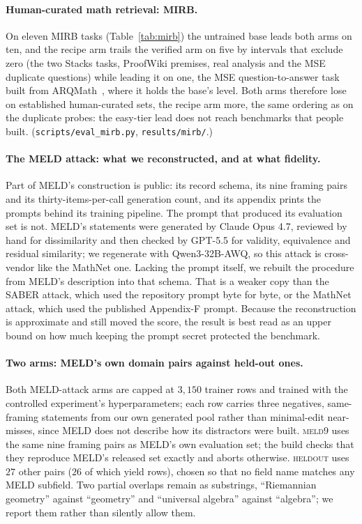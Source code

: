 \paragraph{Human-curated math retrieval: MIRB.}On eleven MIRB tasks (Table~\ref{tab:mirb}) the untrained base leads both arms on ten, and the recipe arm trails the verified arm on five by intervals that exclude zero (the two Stacks tasks, ProofWiki premises, real analysis and the MSE duplicate questions) while leading it on one, the MSE question-to-answer task built from ARQMath~\citep{zanibbi2020arqmath}, where it holds the base's level. Both arms therefore lose on established human-curated sets, the recipe arm more, the same ordering as on the duplicate probes: the easy-tier lead does not reach benchmarks that people built. (\texttt{scripts/eval\_mirb.py}, \texttt{results/mirb/}.)


\paragraph{The MELD attack: what we reconstructed, and at what fidelity.}Part of MELD's construction is public: its record schema, its nine framing pairs and its thirty-items-per-call generation count, and its appendix prints the prompts behind its training pipeline. The prompt that produced its evaluation set is not. MELD's statements were generated by Claude Opus 4.7, reviewed by hand for dissimilarity and then checked by GPT-5.5 for validity, equivalence and residual similarity; we regenerate with Qwen3-32B-AWQ, so this attack is cross-vendor like the MathNet one. Lacking the prompt itself, we rebuilt the procedure from MELD's description into that schema. That is a weaker copy than the SABER attack, which used the repository prompt byte for byte, or the MathNet attack, which used the published Appendix-F prompt. Because the reconstruction is approximate and still moved the score, the result is best read as an upper bound on how much keeping the prompt secret protected the benchmark.

\paragraph{Two arms: MELD's own domain pairs against held-out ones.}Both MELD-attack arms are capped at $3{,}150$ trainer rows and trained with the controlled experiment's hyperparameters; each row carries three negatives, same-framing statements from our own generated pool rather than minimal-edit near-misses, since MELD does not describe how its distractors were built. \textsc{meld9} uses the same nine framing pairs as MELD's own evaluation set; the build checks that they reproduce MELD's released set exactly and aborts otherwise. \textsc{heldout} uses $27$ other pairs ($26$ of which yield rows), chosen so that no field name matches any MELD subfield. Two partial overlaps remain as substrings, ``Riemannian geometry'' against ``geometry'' and ``universal algebra'' against ``algebra''; we report them rather than silently allow them.

